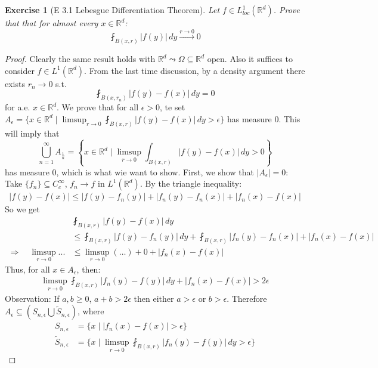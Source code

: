 \documentclass{report}
\theoremstyle{tommy}
\newtheorem{ex}[defn]{Exercise}
\begin{document}
  \begin{ex}[E 3.1 Lebesgue Differentiation Theorem]
    Let \(f \in L_{loc}^1(\mathbb{R}^d)\). Prove that that for almost every \(x \in \mathbb{R}^d\):
    \[\fint_{B(x,r)} |f(y)| \, dy \xrightarrow{r \to 0} 0\]
  \end{ex}

  \begin{proof}
    Clearly the same result holds with \(\mathbb{R}^d \leadsto \Omega \subseteq \mathbb{R}^d\) open. Also it suffices to consider \(f \in L^1(\mathbb{R}^d)\). From the last time discussion, by a density argument there exists \(r_n \to 0\) s.t.
    \[\fint_{B(x, r_n)} |f(y) - f(x)| \, dy = 0\]
    for a.e. \(x \in \mathbb{R}^d\). We prove that for all \(\epsilon > 0\), te set \(A_\epsilon = \{x \in \mathbb{R}^d \mid \limsup_{r \to 0} \fint_{B(x,r)} |f(y) - f(x)| \, dy > \epsilon\}\) has measure \(0\). This will imply that 
    \[\bigcup_{n = 1}^\infty A_{\frac{1}{n}} = \left\{x \in \mathbb{R}^d \mid \limsup_{r \to 0} \int_{B(x,r)} |f(y) - f(x)| \, dy > 0\right\}\] has measure \(0\), which is what wie want to show. First, we show that \(|A_\epsilon| = 0\): Take \(\{f_n\} \subseteq C_c^\infty\), \(f_n \to f\) in \(L^1(\mathbb{R}^d)\). By the triangle inequality:
    \begin{align*}
      |f(y) - f(x)| \le |f(y) - f_n(y)| + |f_n(y) - f_n(x)| + |f_n(x) - f(x)|
    \end{align*}
    So we get 
    \begin{align*}
      &\fint_{B(x,r)} |f(y) - f(x)| \, dy \\
      \quad &\le \fint_{B(x,r)}|f(y) - f_n(y)| \, dy + \fint_{B(x, r)} |f_n(y) - f_n(x)| + |f_n(x) - f(x)| \\
      \Rightarrow \quad \limsup_{r \to 0} ... &\le \limsup_{r \to 0} (\dots) +0 + |f_n(x) - f(x)|
    \end{align*}
    Thus, for all \(x \in A_\epsilon\), then:
    \begin{align*}
      \limsup_{r \to 0} \fint_{B(x, r)} |f_n(y) - f(y)| \, dy + |f_n(x) - f(x)| > 2 \epsilon
    \end{align*}
    Observation: If \(a, b \ge 0\), \(a + b > 2 \epsilon\) then either \(a > \epsilon\) or \(b > \epsilon\). Therefore \(A_\epsilon \subseteq \left(S_{n, \epsilon} \bigcup \tilde S_{n, \epsilon}\right)\), where
    \begin{align*}
      S_{n, \epsilon} &= \{x \mid |f_n(x) - f(x)| > \epsilon\} \\
      \tilde S_{n, \epsilon} &= \{x \mid \limsup_{r \to 0} \fint_{B(x,r)} |f_n(y) - f(y)| \, dy > \epsilon\}

\end{align*}
\end{proof}
\end{document}

